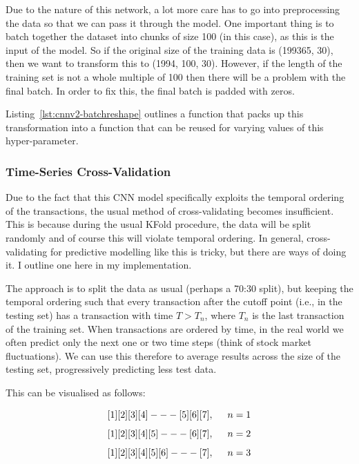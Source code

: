 \documentclass[12pt,a4paper,twoside]{report}
\begin{document}
Due to the nature of this network, a lot more care has to go into preprocessing the data so that we can pass it through the model. One important thing is to batch together the dataset into chunks of size 100 (in this case), as this is the input of the model. So if the original size of the training data is (199365, 30), then we want to transform this to (1994, 100, 30). However, if the length of the training set is not a whole multiple of 100 then there will be a problem with the final batch. In order to fix this, the final batch is padded with zeros. 

Listing~\ref{lst:cnnv2-batchreshape} outlines a function that packs up this transformation into a function that can be reused for varying values of this hyper-parameter.



\subsubsection{Time-Series Cross-Validation}

Due to the fact that this CNN model specifically exploits the temporal ordering of the transactions, the usual method of cross-validating becomes insufficient. This is because during the usual KFold procedure, the data will be split randomly and of course this will violate temporal ordering. In general, cross-validating for predictive modelling like this is tricky, but there are ways of doing it. I outline one here in my implementation. 

The approach is to split the data as usual (perhaps a 70:30 split), but keeping the temporal ordering such that every transaction after the cutoff point (i.e., in the testing set) has a transaction with time $T > T_{n} $, where $T_{n}$ is the last transaction of the training set. When transactions are ordered by time, in the real world we often predict only the next one or two time steps (think of stock market fluctuations). We can use this therefore to average results across the size of the testing set, progressively predicting less test data. 

This can be visualised as follows:

$$ [1] [2] [3] [4]  --- [5] [6] [7] , \hspace{5mm}  n=1$$
$$ [1] [2] [3] [4] [5] --- [6] [7] ,\hspace{5mm}  n=2$$
$$ [1] [2] [3] [4] [5] [6] --- [7] ,\hspace{5mm}  n=3$$
\end{document}
